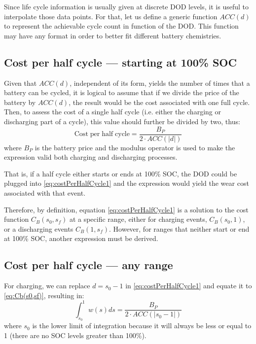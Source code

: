 \documentclass{ieeeaccess}
\begin{document}
    Since life cycle information is usually given at discrete DOD levels, it is useful to interpolate those data points. For that, let us define a generic function $ACC(d)$ to represent the achievable cycle count in function of the DOD. This function may have any format in order to better fit different battery chemistries.

    \subsection{Cost per half cycle --- starting at 100\% SOC}
    Given that $ACC(d)$, independent of its form, yields the number of times that a battery can be cycled, it is logical to assume that if we divide the price of the battery by $ACC(d)$, the result would be the cost associated with one full cycle. Then, to assess the cost of a single half cycle (i.e. either the charging or discharging part of a cycle), this value should further be divided by two, thus:
    \begin{equation}
        \mathrm{Cost \; per \; half \; cycle} = \frac{B_{P}}{2 \cdot ACC(|d|)}
        \label{eq:costPerHalfCycle1}
    \end{equation}
    where $B_{P}$ is the battery price and the modulus operator is used to make the expression valid both charging and discharging processes.

    That is, if a half cycle either starts or ends at 100\% SOC, the DOD could be plugged into \eqref{eq:costPerHalfCycle1} and the expression would yield the wear cost associated with that event.

    Therefore, by definition, equation \eqref{eq:costPerHalfCycle1} is a solution to the cost function $C_{B}(s_{0}, s_{f})$ at a specific range, either for charging events, $C_{B}(s_{0}, 1)$, or a discharging events $C_{B}(1, s_{f})$. However, for ranges that neither start or end at 100\% SOC, another expression must be derived.

    \subsection{Cost per half cycle --- any range}

    For charging, we can replace $d=s_{0}-1$ in \eqref{eq:costPerHalfCycle1} and equate it to \eqref{eq:Cb(s0,sf)}, resulting in:
    \begin{equation}
        \int_{s_{0}}^{1}w(s)ds = \frac{B_{P}}{2 \cdot ACC(|s_{0}-1|)}
        \label{eq:costCharging100}
    \end{equation}
    where $s_{0}$ is the lower limit of integration because it will always be less or equal to 1 (there are no SOC levels greater than 100\%).
\end{document}
